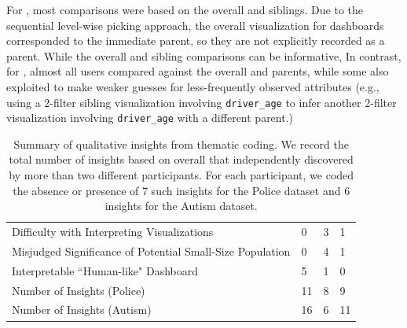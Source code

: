 \par For \BFS, most comparisons were based on the overall and siblings. Due to the sequential level-wise picking approach, the overall visualization for \BFS dashboards corresponded to the immediate parent, so they are not explicitly recorded as a parent. While the overall and sibling comparisons can be informative,  In contrast, for \system, almost all users compared against the overall and parents, while some also exploited  to make weaker guesses for less-frequently observed attributes (e.g., using a 2-filter sibling visualization involving \texttt{driver\_age} to infer another 2-filter visualization involving \texttt{driver\_age} with a different parent.)
\begin{table}[ht!]
	\centering
	\begin{tabular}{|l|l|l|l|}
	\hline & \system & \cluster & \BFS \\ \hline
	Difficulty with Interpreting Visualizations & 0 & \cellcolor[HTML]{FD6864}3 & 1 \\ \hline
	Misjudged Significance of Potential Small-Size Population & 0 & \cellcolor[HTML]{FD6864}4 & 1 \\ \hline
	Interpretable ``Human-like" Dashboard & \cellcolor[HTML]{9AFF99}5 & 1 & 0 \\ \hline
	Number of Insights (Police) & \cellcolor[HTML]{9AFF99}11 & 8 & 9 \\ \hline
	Number of Insights (Autism) & \cellcolor[HTML]{9AFF99}16 & 6 & 11 \\\hline
	\end{tabular}
\caption{Summary of qualitative insights from thematic coding. We record the total number of insights based on overall  that  independently discovered by more than two different participants. For each participant, we coded the absence or presence of 7 such insights for the Police dataset and 6 insights for the Autism dataset.}%
\label{table:thematic_summary}
\vspace{-15pt}
\end{table}
